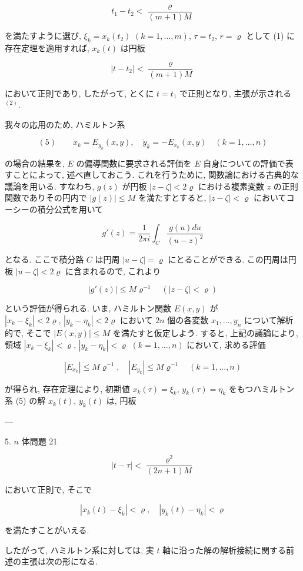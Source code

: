 \documentclass[dvipdfmx, leqno]{jsbook}
\begin{document}
$$t_1 - t_2 < \frac{\varrho}{(m+1)M}$$

を満たすように選び, $\xi_k = x_k(t_2)$ $(k=1,\dots,m)$, $\tau = t_2$, $r = \varrho$ として (1) に存在定理を適用すれば, $x_k(t)$ は円板

$$|t - t_2| < \frac{\varrho}{(m+1)M}$$

において正則であり, したがって, とくに $t = t_1$ で正則となり, 主張が示される$^{(2)}$.

我々の応用のため, ハミルトン系

$$(5) \qquad \dot{x}_k = E_{y_k}(x, y), \quad \dot{y}_k = -E_{x_k}(x, y) \quad (k=1,\dots,n)$$

の場合の結果を, $E$ の偏導関数に要求される評価を $E$ 自身についての評価で表すことによって, 述べ直しておこう. これを行うために, 関数論における古典的な議論を用いる. すなわち, $g(z)$ が円板 $|z - \zeta| < 2\varrho$ における複素変数 $z$ の正則関数でありその円内で $|g(z)| \leq M$ を満たすとすると, $|z - \zeta| < \varrho$ においてコーシーの積分公式を用いて

$$g'(z) = \frac{1}{2\pi i} \int_C \frac{g(u)du}{(u - z)^2}$$

となる. ここで積分路 $C$ は円周 $|u - \zeta| = \varrho$ にとることができる. この円周は円板 $|u - \zeta| < 2\varrho$ に含まれるので, これより

$$|g'(z)| \leq M\varrho^{-1} \quad (|z - \zeta| < \varrho)$$

という評価が得られる. いま, ハミルトン関数 $E(x, y)$ が $|x_k - \xi_k| < 2\varrho, \, |y_k - \eta_k| < 2\varrho$ において $2n$ 個の各変数 $x_1, \dots, y_n$ について解析的で, そこで $|E(x, y)| \leq M$ を満たすと仮定しよう. すると, 上記の議論により, 領域 $|x_k - \xi_k| < \varrho, \, |y_k - \eta_k| < \varrho$ $(k=1,\dots,n)$ において, 求める評価

$$|E_{x_k}| \leq M\varrho^{-1}, \quad |E_{y_k}| \leq M\varrho^{-1} \quad (k=1,\dots,n)$$

が得られ, 存在定理により, 初期値 $x_k(\tau) = \xi_k, \, y_k(\tau) = \eta_k$ をもつハミルトン系 (5) の解 $x_k(t), \, y_k(t)$ は, 円板

---

5. $n$ 体問題 21

$$|t - \tau| < \frac{\varrho^2}{(2n+1)M}$$

において正則で, そこで

$$|x_k(t) - \xi_k| < \varrho, \quad |y_k(t) - \eta_k| < \varrho$$

を満たすことがいえる.

したがって, ハミルトン系に対しては, 実 $t$ 軸に沿った解の解析接続に関する前述の主張は次の形になる.
\end{document}
